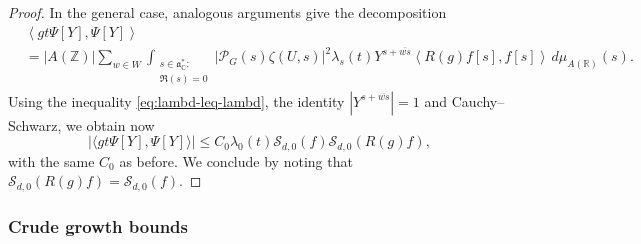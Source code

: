 \begin{proof}
  In the general case, analogous arguments give the decomposition
  \begin{align*}
    &\left\langle g t \Psi[Y], \Psi[Y] \right\rangle \\
    &=
      |A(\mathbb{Z})|
      \sum_{w \in W}
      \int_{
      \substack{
      s \in \mathfrak{a}_{\mathbb{C}}^* :  \\
    \Re(s) = 0
    }
    }
    |\mathcal{P}_G(s) \zeta(U,s)|^2
    \lambda_s(t)
    Y^{s + \overline{w s}}
    \left\langle R(g) f[s], f[s] \right\rangle
    \, d \mu_{A(\mathbb{R})}(s).
  \end{align*}
  Using the inequality \eqref{eq:lambd-leq-lambd}, the identity $\left\lvert Y^{s+ \overline{w s}} \right\rvert = 1$ and Cauchy--Schwarz, we obtain now
  \begin{equation*}
    \left\lvert \langle g t \Psi[Y], \Psi[Y] \rangle \right\rvert \leq C_0 \lambda_0(t) \mathcal{S}_{d,0}(f) \mathcal{S}_{d,0}(R(g) f),
  \end{equation*}
  with the same $C_0$ as before.  We conclude by noting that $\mathcal{S}_{d,0}(R(g) f) = \mathcal{S}_{d,0}(f)$.
\end{proof}


\subsubsection{Crude growth bounds}

